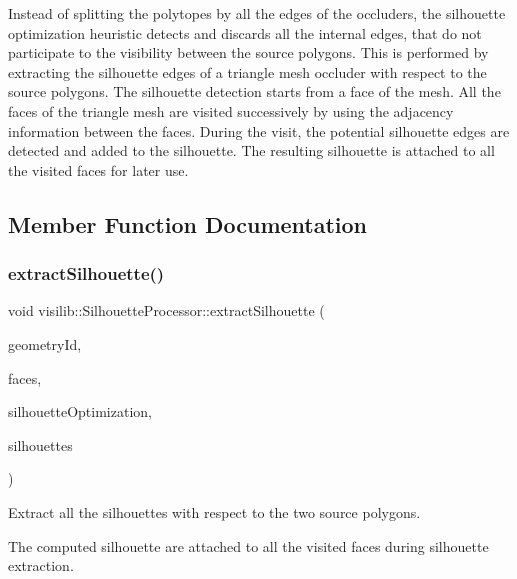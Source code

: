 Instead of splitting the polytopes by all the edges of the occluders, the silhouette optimization heuristic detects and discards all the internal edges, that do not participate to the visibility between the source polygons. This is performed by extracting the silhouette edges of a triangle mesh occluder with respect to the source polygons. The silhouette detection starts from a face of the mesh. All the faces of the triangle mesh are visited successively by using the adjacency information between the faces. During the visit, the potential silhouette edges are detected and added to the silhouette. The resulting silhouette is attached to all the visited faces for later use. 

\subsection{Member Function Documentation}
\mbox{\label{classvisilib_1_1_silhouette_processor_adf8cb49855ad70e3994ff65bc4740fb2}} 
\subsubsection{\texorpdfstring{extractSilhouette()}{extractSilhouette()}}
{\footnotesize\ttfamily void visilib\+::\+Silhouette\+Processor\+::extract\+Silhouette (\begin{DoxyParamCaption}\item[{size\+\_\+t}]{geometry\+Id,  }\item[{const std\+::vector$<$ \mbox{\hyperlink{classvisilib_1_1_silhouette_mesh_face}{Silhouette\+Mesh\+Face}} $>$ \&}]{faces,  }\item[{bool}]{silhouette\+Optimization,  }\item[{std\+::vector$<$ \mbox{\hyperlink{classvisilib_1_1_silhouette}{Silhouette}} $\ast$ $>$ \&}]{silhouettes }\end{DoxyParamCaption})\hspace{0.3cm}{\ttfamily [inline]}}



Extract all the silhouettes with respect to the two source polygons. 

The computed silhouette are attached to all the visited faces during silhouette extraction. \mbox{\label{classvisilib_1_1_silhouette_processor_a8b2f9edf695dd88b637e4a8b663214a0}} 

